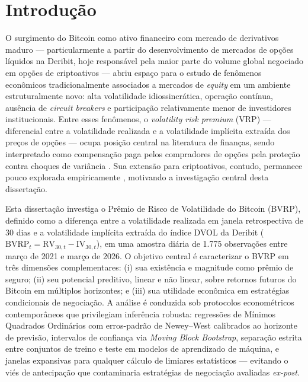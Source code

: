 ﻿\chapter{Introdução}
\label{chap:introducao}

O surgimento do Bitcoin como ativo financeiro com mercado de derivativos maduro --- particularmente a partir do desenvolvimento de mercados de opções líquidos na Deribit, hoje responsável pela maior parte do volume global negociado em opções de criptoativos --- abriu espaço para o estudo de fenômenos econômicos tradicionalmente associados a mercados de \textit{equity} em um ambiente estruturalmente novo: alta volatilidade idiossincrática, operação contínua, ausência de \textit{circuit breakers} e participação relativamente menor de investidores institucionais. Entre esses fenômenos, o \textit{volatility risk premium} (VRP) --- diferencial entre a volatilidade realizada e a volatilidade implícita extraída dos preços de opções --- ocupa posição central na literatura de finanças, sendo interpretado como compensação paga pelos compradores de opções pela proteção contra choques de variância \citep{bollerslev2011VRP, bali2009volatilitypremium, pan2006jumpRisk}. Sua extensão para criptoativos, contudo, permanece pouco explorada empiricamente \citep{hoang2023cryptoVRP, alexanderImeraj2019, almeida2024cryptoVRP}, motivando a investigação central desta dissertação.

Esta dissertação investiga o Prêmio de Risco de Volatilidade do Bitcoin (BVRP), definido como a diferença entre a volatilidade realizada em janela retrospectiva de 30 dias e a volatilidade implícita extraída do índice DVOL da Deribit ($\text{BVRP}_t = \text{RV}_{30,t} - \text{IV}_{30,t}$), em uma amostra diária de 1.775 observações entre março de 2021 e março de 2026. O objetivo central é caracterizar o BVRP em três dimensões complementares: (i) sua existência e magnitude como prêmio de seguro; (ii) seu potencial preditivo, linear e não linear, sobre retornos futuros do Bitcoin em múltiplos horizontes; e (iii) sua utilidade econômica em estratégias condicionais de negociação. A análise é conduzida sob protocolos econométricos contemporâneos que privilegiam inferência robusta: regressões de Mínimos Quadrados Ordinários com erros-padrão de Newey--West calibrados ao horizonte de previsão, intervalos de confiança via \textit{Moving Block Bootstrap}, separação estrita entre conjuntos de treino e teste em modelos de aprendizado de máquina, e janelas expansivas para qualquer cálculo de limiares estatísticos --- evitando o viés de antecipação que contaminaria estratégias de negociação avaliadas \textit{ex-post}.

